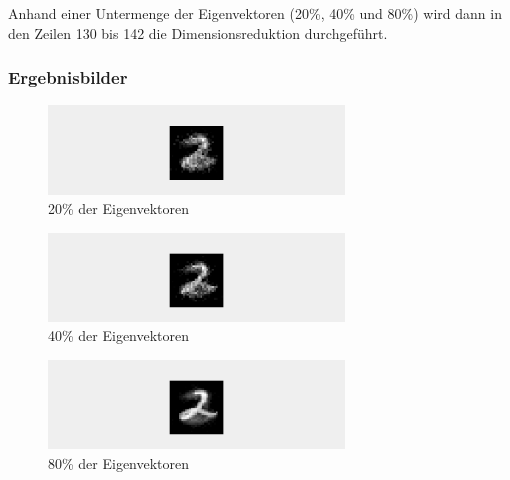 \documentclass[12pt]{article}
\begin{document}
Anhand einer Untermenge der Eigenvektoren (20\%, 40\% und 80\%) wird dann in den Zeilen 130 bis 142 die Dimensionsreduktion durchgeführt.

\subsubsection*{Ergebnisbilder}
\begin{figure}[H]
  \centering
  \includegraphics[width=0.7\textwidth, keepaspectratio]{pca_20.png}\\
  20\% der Eigenvektoren
\end{figure}
\begin{figure}[H]
  \centering
  \includegraphics[width=0.7\textwidth, keepaspectratio]{pca_40.png}\\
  40\% der Eigenvektoren
\end{figure}
\begin{figure}[H]
  \centering
  \includegraphics[width=0.7\textwidth, keepaspectratio]{pca_80.png}\\
  80\% der Eigenvektoren
\end{figure}
\end{document}
